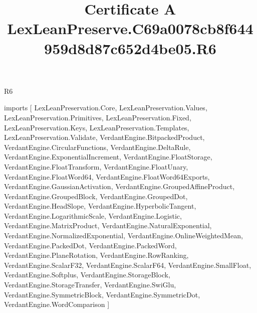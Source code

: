 \begin{lexlean}{R6}
\title{Certificate A LexLeanPreserve.C69a0078cb8f644959d8d87c652d4be05.R6}
\begin{coremodule}
imports [
  LexLeanPreservation.Core,
  LexLeanPreservation.Values,
  LexLeanPreservation.Primitives,
  LexLeanPreservation.Fixed,
  LexLeanPreservation.Keys,
  LexLeanPreservation.Templates,
  LexLeanPreservation.Validate,
  VerdantEngine.BitpackedProduct,
  VerdantEngine.CircularFunctions,
  VerdantEngine.DeltaRule,
  VerdantEngine.ExponentialIncrement,
  VerdantEngine.FloatStorage,
  VerdantEngine.FloatTransform,
  VerdantEngine.FloatUnary,
  VerdantEngine.FloatWord64,
  VerdantEngine.FloatWord64Exports,
  VerdantEngine.GaussianActivation,
  VerdantEngine.GroupedAffineProduct,
  VerdantEngine.GroupedBlock,
  VerdantEngine.GroupedDot,
  VerdantEngine.HeadSlope,
  VerdantEngine.HyperbolicTangent,
  VerdantEngine.LogarithmicScale,
  VerdantEngine.Logistic,
  VerdantEngine.MatrixProduct,
  VerdantEngine.NaturalExponential,
  VerdantEngine.NormalizedExponential,
  VerdantEngine.OnlineWeightedMean,
  VerdantEngine.PackedDot,
  VerdantEngine.PackedWord,
  VerdantEngine.PlaneRotation,
  VerdantEngine.RowRanking,
  VerdantEngine.ScalarF32,
  VerdantEngine.ScalarF64,
  VerdantEngine.SmallFloat,
  VerdantEngine.Softplus,
  VerdantEngine.StorageBlock,
  VerdantEngine.StorageTransfer,
  VerdantEngine.SwiGlu,
  VerdantEngine.SymmetricBlock,
  VerdantEngine.SymmetricDot,
  VerdantEngine.WordComparison
]


\end{coremodule}
\end{lexlean}
